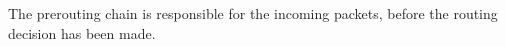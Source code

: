 The prerouting chain is responsible for the incoming packets, before the routing decision has been made.
